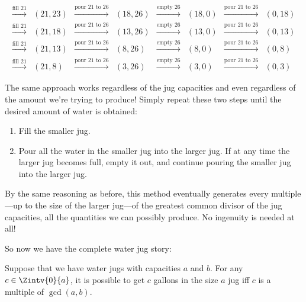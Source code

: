 \[\begin{array}{cccccccc}
\xrightarrow{\text{fill 21}} & (21,23)&
\xrightarrow{\text{pour 21 to 26}} & (18,26)& \xrightarrow{\text{empty
    26}} & (18,0)& \xrightarrow{\text{pour 21 to 26}} &
(0,18)\\
\xrightarrow{\text{fill 21}} & (21,18)&
\xrightarrow{\text{pour 21 to 26}} & (13,26)& \xrightarrow{\text{empty
    26}} & (13,0)& \xrightarrow{\text{pour 21 to 26}} &
(0,13)\\
\xrightarrow{\text{fill 21}} & (21,13)&
\xrightarrow{\text{pour 21 to 26}} & (8,26)& \xrightarrow{\text{empty
    26}} & (8,0)& \xrightarrow{\text{pour 21 to 26}} &
(0,8)\\
\xrightarrow{\text{fill 21}} & (21,8)& \xrightarrow{\text{pour
    21 to 26}} & (3,26)& \xrightarrow{\text{empty 26}} & (3,0)&
\xrightarrow{\text{pour 21 to 26}} & (0,3)
\end{array}
\]

The same approach works regardless of the jug capacities and even
regardless of the amount we're trying to produce!  Simply repeat these
two steps until the desired amount of water is obtained:
\begin{enumerate}
\item Fill the smaller jug.

\item Pour all the water in the smaller jug into the larger jug.  If
  at any time the larger jug becomes full, empty it out, and continue
  pouring the smaller jug into the larger jug.
\end{enumerate}
By the same reasoning as before, this method eventually generates
every multiple---up to the size of the larger jug---of the greatest
common divisor of the jug capacities, all the quantities we
can possibly produce.  No ingenuity is needed at all!

So now we have the complete water jug story:
\begin{theorem}\label{th:waterjugs}
Suppose that we have water jugs with capacities $a$ and $b$.  For any
$c \in \Zintv{0}{a}$, it is possible to get $c$ gallons in the size $a$ jug
iff $c$ is a multiple of $\gcd(a, b)$.
\end{theorem}

